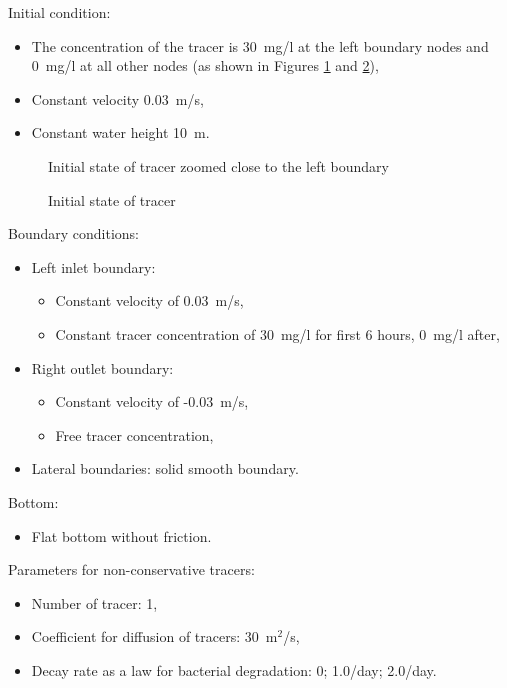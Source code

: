 Initial condition:
\begin{itemize}
\item The concentration of the tracer is 30~mg/l at the left boundary
nodes and 0~mg/l at all other nodes (as shown in Figures
\ref{fig:tracer_decay:tracer_t0_zoomed} and \ref{fig:tracer_decay:tracer_t0}),
\item Constant velocity 0.03~m/s,
\item Constant water height 10~m.
\end{itemize}

\begin{figure}[H]
\centering
\caption{Initial state of tracer zoomed close to the left boundary}\label{fig:tracer_decay:tracer_t0_zoomed}
\end{figure}

\begin{figure}[H]
\centering
\caption{Initial state of tracer}\label{fig:tracer_decay:tracer_t0}
\end{figure}

Boundary conditions:
\begin{itemize}
\item Left inlet boundary:
\begin{itemize}
\item Constant velocity of 0.03~m/s,
\item Constant tracer concentration of 30~mg/l for first 6 hours, 0~mg/l after,
\end{itemize}
\item Right outlet boundary:
\begin{itemize}
\item Constant velocity of -0.03~m/s,
\item Free tracer concentration,
\end{itemize}
\item Lateral boundaries: solid smooth boundary.
\end{itemize}

Bottom:
\begin{itemize}
\item Flat bottom without friction.
\end{itemize}

Parameters for non-conservative tracers:
\begin{itemize}
\item Number of tracer: 1,
\item Coefficient for diffusion of tracers: 30~m$^2$/s,
\item Decay rate as a law for bacterial degradation:
0; 1.0/day; 2.0/day.
\end{itemize}

